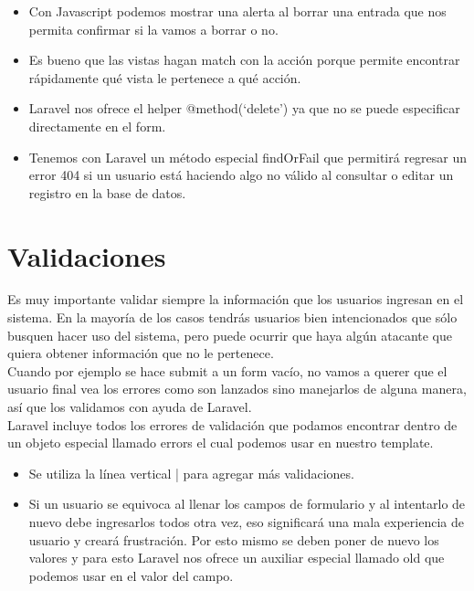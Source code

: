 \documentclass{article}
\begin{document}
\begin{itemize}
  \item Con Javascript podemos mostrar una alerta al borrar una entrada que nos
    permita confirmar si la vamos a borrar o no.
  \item Es bueno que las vistas hagan match con la acción porque permite
    encontrar rápidamente qué vista le pertenece a qué acción.
  \item Laravel nos ofrece el helper @method(‘delete’) ya que no se puede
    especificar directamente en el form.
  \item Tenemos con Laravel un método especial findOrFail que permitirá
    regresar un error 404 si un usuario está haciendo algo no válido al
    consultar o editar un registro en la base de datos.
\end{itemize}

\section{Validaciones}%
Es muy importante validar siempre la información que los usuarios ingresan en
el sistema. En la mayoría de los casos tendrás usuarios bien intencionados que
sólo busquen hacer uso del sistema, pero puede ocurrir que haya algún atacante
que quiera obtener información que no le pertenece.\\

Cuando por ejemplo se hace submit a un form vacío, no vamos a querer que el
usuario final vea los errores como son lanzados sino manejarlos de alguna
manera, así que los validamos con ayuda de Laravel.\\

Laravel incluye todos los errores de validación que podamos encontrar dentro de
un objeto especial llamado errors el cual podemos usar en nuestro template.\\

\begin{itemize}
  \item Se utiliza la línea vertical | para agregar más validaciones.
  \item Si un usuario se equivoca al llenar los campos de formulario y al
    intentarlo de nuevo debe ingresarlos todos otra vez, eso significará una
    mala experiencia de usuario y creará frustración. Por esto mismo se deben
    poner de nuevo los valores y para esto Laravel nos ofrece un auxiliar
    especial llamado old que podemos usar en el valor del campo.
\end{itemize}
\end{document}
